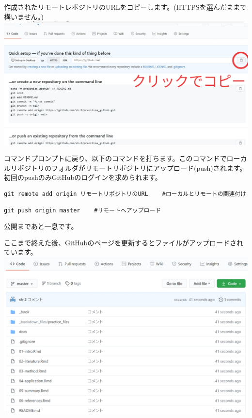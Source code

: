 \documentclass[
]{book}
\begin{document}
作成されたリモートレポジトリのURLをコピーします。(HTTPSを選んだままで構いません。)
\includegraphics{pics/HTTPS.jpg}

コマンドプロンプトに戻り、以下のコマンドを打ちます。このコマンドでローカルリポジトリのフォルダがリモートリポジトリにアップロード(push)されます。\\
初回のpushのみGitHubのログインを求められます。

\begin{verbatim}
git remote add origin リモートリポジトリのURL    #ローカルとリモートの関連付け
\end{verbatim}

\begin{verbatim}
git push origin master    #リモートへアップロード
\end{verbatim}

公開まであと一息です。

ここまで終えた後、GitHubのページを更新するとファイルがアップロードされています。\\
\includegraphics{pics/Hub1.jpg}
\end{document}

